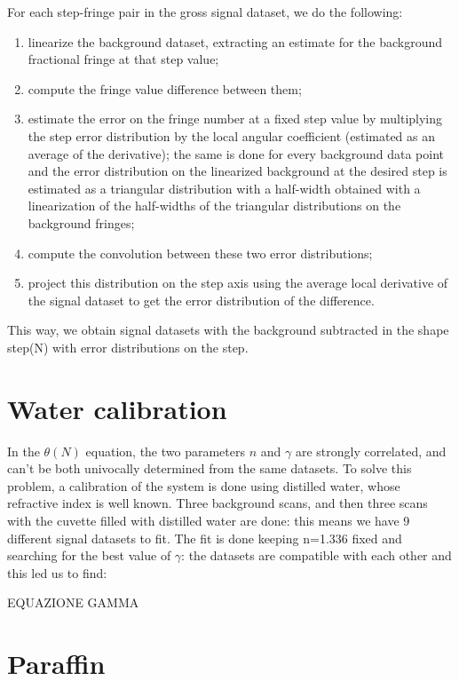 \documentclass[a4paper, 12pt]{article}
\begin{document}
For each step-fringe pair in the gross signal dataset, we do the following:

\begin{enumerate}
  \item linearize the background dataset, extracting an estimate for the background fractional fringe at that step value;
  \item compute the fringe value difference between them;
  \item   estimate the error on the fringe number at a fixed step value by multiplying the step error distribution by the local angular coefficient (estimated as an average of the derivative); the same is done for every background data point and the error distribution on the linearized background at the desired step is estimated as a triangular distribution with a half-width obtained with a linearization of the half-widths of the triangular distributions on the background fringes;
  \item compute the convolution between these two error distributions;
  \item project this distribution on the step axis using the average local derivative of the signal dataset to get the error distribution of the difference.
\end{enumerate}

This way, we obtain signal datasets with the background subtracted in the shape step(N) with error distributions on the step.

\section{Water calibration}

In the \(\theta(N)\)  equation, the two parameters \(n\) and \(\gamma\) are strongly correlated, and can’t be both univocally determined from the same datasets. To solve this problem, a calibration of the system is done using distilled water, whose refractive index is well known. Three background scans, and then three scans with the cuvette filled with distilled water are done: this means we have 9 different signal datasets to fit. The fit is done keeping n=1.336 fixed and searching for the best value of \(\gamma\): the datasets are compatible with each other and this led us to find:

EQUAZIONE GAMMA

\section{Paraffin}
\end{document}
